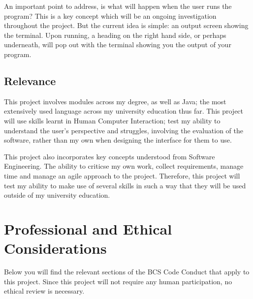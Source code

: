 \documentclass[a4paper, 12pt]{article}
\begin{document}
            An important point to address, is what will happen when the user runs the program? This is a key
            concept which will be an ongoing investigation throughout the project. But the current idea is
            simple: an output screen showing the terminal. Upon running, a heading on the right hand side,
            or perhaps underneath, will pop out with the terminal showing you the output of your program.


            \subsection{Relevance}
            This project involves modules across my degree, as well as Java; the most extensively
            used language across my university education thus far. This project will use skills learnt
            in Human Computer Interaction; test my ability to understand the user's perspective and
            struggles, involving the evaluation of the software, rather than my own when designing
            the interface for them to use.
        
            This project also incorporates key concepts understood from Software Engineering.
            The ability to criticse my own work, collect requirements, manage time and manage an
            agile approach to the project. Therefore, this project will test my ability to make use
            of several skills in such a way that they will be used outside of my university education.

    \clearpage
    \section{Professional and Ethical Considerations}
        Below you will find the relevant sections of the BCS Code Conduct that apply to this 
        project. Since this project will not require any human participation, no ethical review 
        is necessary.
\end{document}
